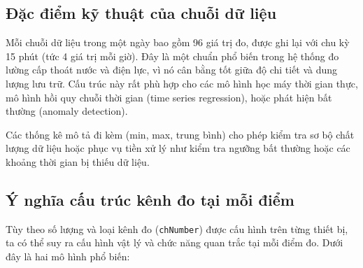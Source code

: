 
\subsection{Đặc điểm kỹ thuật của chuỗi dữ liệu}

Mỗi chuỗi dữ liệu trong một ngày bao gồm 96 giá trị đo, được ghi lại với chu kỳ 15 phút (tức 4 giá trị mỗi giờ). Đây là một chuẩn phổ biến trong hệ thống đo lường cấp thoát nước và điện lực, vì nó cân bằng tốt giữa độ chi tiết và dung lượng lưu trữ. Cấu trúc này rất phù hợp cho các mô hình học máy thời gian thực, mô hình hồi quy chuỗi thời gian (time series regression), hoặc phát hiện bất thường (anomaly detection).

Các thống kê mô tả đi kèm (min, max, trung bình) cho phép kiểm tra sơ bộ chất lượng dữ liệu hoặc phục vụ tiền xử lý như kiểm tra ngưỡng bất thường hoặc các khoảng thời gian bị thiếu dữ liệu.

\subsection{Ý nghĩa cấu trúc kênh đo tại mỗi điểm}

Tùy theo số lượng và loại kênh đo (\texttt{chNumber}) được cấu hình trên từng thiết bị, ta có thể suy ra cấu hình vật lý và chức năng quan trắc tại mỗi điểm đo. Dưới đây là hai mô hình phổ biến:

